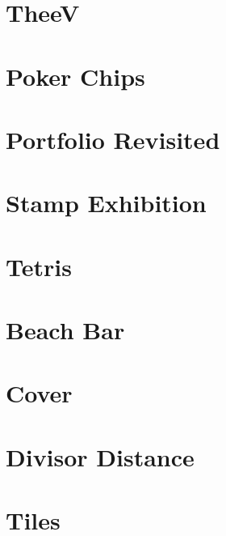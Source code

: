 \documentclass[a4paper, 10pt]{article}
\let\stdsection\section
\renewcommand\section{\newpage\stdsection}
\newcommand{\includecode}[1]{
    }
\begin{document}
    \section{TheeV}
        \includecode{../problems/w09/TheeV/TheeV1.cpp}
   
    
    \section{Poker Chips}
        \includecode{../problems/w10/Poker_Chips/PokerChips1.cpp}
        
    \section{Portfolio Revisited}
        \includecode{../problems/w10/Portfolios_Revisited/PortfolioRevisited1.cpp}
        
    \section{Stamp Exhibition}
        \includecode{../problems/w10/Stamp_Exhibition/StampExhibition1.cpp}
        
    \section{Tetris}
        \includecode{../problems/w10/Tetris/Tetris1.cpp}
 
    
    \section{Beach Bar}
        \includecode{../problems/w11/Beach_Bar/BeachBar1.cpp}
        
    \section{Cover}
        \includecode{../problems/w11/Cover/Cover1.cpp}
        
    \section{Divisor Distance}
        \includecode{../problems/w11/Divisor_Distance/DivisorDistance1.cpp}
        
    \section{Tiles}
        \includecode{../problems/w11/Tiles/Tiles1.cpp}
        
\end{document}
